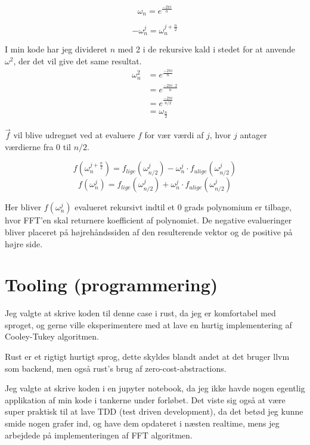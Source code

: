 \documentclass[11pt,a4paper]{article}
\begin{document}
$$
\omega_n = e^{\frac{-2\pi i}{n}}
$$

$$
-\omega_n^j = \omega_n^{j+\frac{n}{2}}
$$

I min kode har jeg divideret \(n\) med 2 i de rekursive kald i stedet for at anvende \(\omega^2\), der det vil give det same resultat.
\begin{equation}
\begin{split}
\omega_n^2 &= e^{\frac{-2\pi i}{n}} \\
&= e^{\frac{-2\pi i \cdot 2}{n}} \\
&= e^{\frac{-2\pi i}{n/2}} \\
&= \omega_{\frac{n}{2}}
\end{split}
\end{equation}

\(\vec{f}\) vil blive udregnet ved at evaluere \(f\) for vær værdi af \(j\), hvor \(j\) antager værdierne fra 0 til \(n/2\).

$$
f(\omega^{j+\frac{n}{2}}_n) = f_{lige}(\omega^j_{n/2}) - \omega^j_n \cdot f_{ulige}(\omega^j_{n/2})
$$
$$
f(\omega^j_n) = f_{lige}(\omega^j_{n/2}) + \omega^j_n \cdot f_{ulige}(\omega^j_{n/2})
$$

Her bliver \(f(\omega_n^j)\) evalueret rekursivt indtil et 0 grads polynomium er tilbage, hvor FFT'en skal returnere koefficient af polynomiet.
De negative evalueringer bliver placeret på højrehåndssiden af den resulterende vektor og de positive på højre side.

\section{Tooling (programmering)}
\label{sec:orga5fe218}
Jeg valgte at skrive koden til denne case i rust, da jeg er komfortabel med sproget,
og gerne ville eksperimentere med at lave en hurtig implementering af Cooley-Tukey algoritmen.

Rust er et rigtigt hurtigt sprog, dette skyldes blandt andet at det bruger llvm som backend,
men også rust's brug af zero-cost-abstractions.

Jeg valgte at skrive koden i en jupyter notebook, da jeg ikke havde nogen egentlig
applikation af min kode i tankerne under forløbet.
Det viste sig også at være super praktisk til at lave TDD (test driven development),
da det betød jeg kunne smide nogen grafer ind, og have dem opdateret i næsten realtime,
mens jeg arbejdede på implementeringen af FFT algoritmen.
\end{document}
